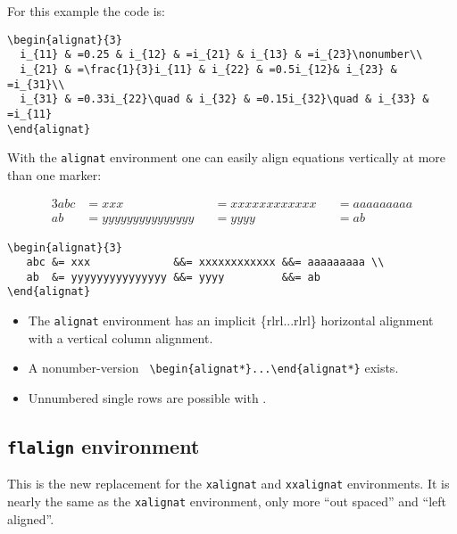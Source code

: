 \begin{table}[htb]
For this example the code is:
\begin{lstlisting}[xleftmargin=-1cm,xrightmargin=-1.5cm]
\begin{alignat}{3}
  i_{11} & =0.25 & i_{12} & =i_{21} & i_{13} & =i_{23}\nonumber\\
  i_{21} & =\frac{1}{3}i_{11} & i_{22} & =0.5i_{12}& i_{23} & =i_{31}\\
  i_{31} & =0.33i_{22}\quad & i_{32} & =0.15i_{32}\quad & i_{33} & =i_{11}
\end{alignat}
\end{lstlisting}

With the \verb+alignat+ environment one can easily align equations vertically
at more than one marker:

\begin{alignat}{3}
   abc &= xxx             &&= xxxxxxxxxxxx &&= aaaaaaaaa \\
   ab  &= yyyyyyyyyyyyyyy &&= yyyy         &&= ab
\end{alignat}
\begin{lstlisting}
\begin{alignat}{3}
   abc &= xxx             &&= xxxxxxxxxxxx &&= aaaaaaaaa \\
   ab  &= yyyyyyyyyyyyyyy &&= yyyy         &&= ab
\end{alignat}
\end{lstlisting}




\begin{itemize}
\item The \texttt{alignat} environment has an implicit \{rlrl...rlrl\}
horizontal alignment with a vertical column alignment.
\item A nonumber-version \texttt{\small
\textbackslash{}begin\{alignat{*}\}...\textbackslash{}end\{alignat{*}\}}
exists.
\item Unnumbered single rows are possible with .    %
\end{itemize}

\subsection{\texttt{flalign} environment}\label{ams:flalign}
This is the new replacement for the \texttt{xalignat} and \texttt{xxalignat}
environments. It is nearly the same as the  \texttt{xalignat} environment, only
more ``out spaced'' and ``left aligned''. 


\end{table}
